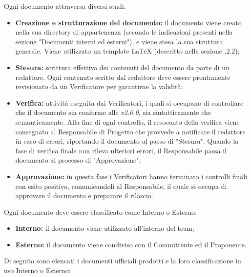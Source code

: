       Ogni documento attraversa diversi stadi:
      \begin{itemize}
        \item \textbf{Creazione e strutturazione del documento:} il documento viene creato nella sua directory di appartenenza (secondo le indicazioni presenti nella sezione "Documenti interni ed esterni"), e viene stesa la sua struttura generale. Viene utilizzato un template \LaTeX{} (descritto nella sezione .2.2);
        \item \textbf{Stesura:} scrittura effettiva dei contenuti del documento da parte di un redattore. Ogni contenuto scritto dal redattore deve essere prontamente revisionato da un Verificatore per garantirne la validità;
        \item \textbf{Verifica:} attività eseguita dai Verificatori, i quali si occupano di controllare che il documento sia conforme alle \textit{\NdP{} v2.0.0}, sia sintatticamente che semanticamente. Alla fine di ogni controllo, il resoconto della verifica viene consegnato al Responsabile di Progetto che provvede a notificare il redattore in caso di errori, riportando il documento al passo di "Stesura". Quando la fase di verifica finale non rileva ulteriori errori, il Responsabile passa il documento al processo di "Approvazione";
        \item \textbf{Approvazione:} in questa fase i Verificatori hanno terminato i controlli finali con esito positivo, comunicandoli al Responsabile, il quale si occupa di approvare il documento e preparare il rilascio.
      \end{itemize}
  	Ogni documento deve essere classificato come Interno o Esterno:
  	\begin{itemize}
  		\item \textbf{Interno:} il documento viene utilizzato all'interno del team;
  		\item \textbf{Esterno:} il documento viene condiviso con il Committente ed il Proponente.
  	\end{itemize}
	Di seguito sono elencati i documenti ufficiali prodotti e la loro classificazione in uso Interno o Esterno:
